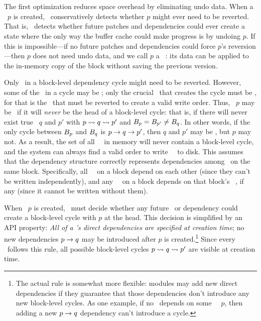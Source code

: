 
\subsection{\Nrb\ \Patches}
\label{sec:patch:nrb}

The first optimization reduces space overhead by
eliminating undo data.
%
When a \patch\ $p$ is created, \Kudos\ conservatively detects whether $p$
 might ever need to be reverted.
%
That is, \Kudos\ detects whether future patches and dependencies could ever
 create a state where the only way the buffer cache could make progress is
 by undoing $p$.
%
If this is impossible---if no future patches and dependencies could force
 $p$'s reversion---then $p$ does not need undo data, and we call $p$ a
 \emph{\nrb\ \patch}: its data can be applied to the in-memory copy of the
 block without saving the previous version.


Only \patches\ in a block-level dependency cycle might need to be reverted.
%
However, some of the \patches\ in a cycle may be \nrb; only the crucial
\patch\ that creates the cycle must be \rb, for that is the \patch\ that
must be reverted to create a valid write order.
%
Thus, \patch\ $p$ may be \nrb\ if it will \emph{never} be the head of a
block-level cycle: that is, if there will never exist true \patches\ $q$
and $p'$ with $p \leadsto q \leadsto p'$ and $B_{p} = B_{p'}
\neq B_{q}$.
%
In other words, if the only cycle between $B_{p}$ and $B_{q}$ is $p
\rightarrow q \rightarrow p'$, then $q$ and $p'$ may be \nrb, but $p$ may
not.
%
As a result, the set of all \nrb\ \patches\ in memory will never contain
a block-level cycle, and the system can always find a valid order to
write \nrb\ \patches\ to disk.
%
This assumes that the dependency structure correctly represents
dependencies among \patches\ on the same block.
%
Specifically, all \nrb\ \patches\ on a block depend on each other (since
they can't be written independently), and any \rb\ \patch\ on a block
depends on that block's \nrb\ \patches, if any (since it cannot be written
without them).


When \patch\ $p$ is created, \Kudos\ must decide whether any future
\patch\ or dependency could create a block-level cycle with $p$ at the
head.
%
This decision is simplified by an API property: \emph{All of a \patch's
direct dependencies are specified at creation time};
%
no new dependencies $p \rightarrow q$ may be introduced after $p$ is
created.\footnote{The actual rule is somewhat more flexible: modules may add
  new direct dependencies if they guarantee that those dependencies
  don't introduce any new block-level cycles.  As one example, if no
  \patch\ depends on some \noop\ \patch\ $p$, then adding a new $p
  \rightarrow q$ dependency can't introduce a cycle.}
%
Since every \patch\ follows this rule, all possible block-level cycles $p
\leadsto q \leadsto p'$ are visible at creation time.


